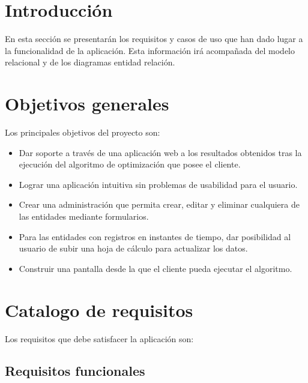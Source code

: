 
\section{Introducción}

En esta sección se presentarán los requisitos y casos de uso que han dado lugar a la funcionalidad de la aplicación. Esta información irá acompañada del modelo relacional y de los diagramas entidad relación.

\section{Objetivos generales}

Los principales objetivos del proyecto son: 

\begin{itemize}
	
	\item Dar soporte a través de una aplicación web a los resultados obtenidos tras la ejecución del algoritmo de optimización que posee el cliente.
	
	\item Lograr una aplicación intuitiva sin problemas de usabilidad para el usuario.

	\item Crear una administración que permita crear, editar y eliminar cualquiera de las entidades mediante formularios.
	
	\item Para las entidades con registros en instantes de tiempo, dar posibilidad al usuario de subir una hoja de cálculo para actualizar los datos.
	
	\item Construir una pantalla desde la que el cliente pueda ejecutar el algoritmo.

\end{itemize}

\section{Catalogo de requisitos}

Los requisitos que debe satisfacer la aplicación son:

\subsection{Requisitos funcionales}

